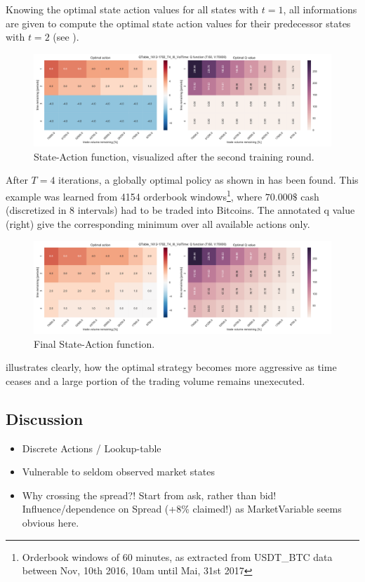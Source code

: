 Knowing the optimal state action values for all states with $t=1$, all informations are given to compute the optimal state action values for their predecessor states with $t=2$ (see ).

\begin{figure}[ht]
	\centering
   \includegraphics[width=1.\textwidth]{content/drawings/heatmap_3months_t2}
	\caption{State-Action function, visualized after the second training round.}
	\label{fig:heatmap:t2}
\end{figure}

After $T=4$ iterations, a globally optimal policy as shown in  has been found. This example was learned from 4154 orderbook windows\footnote{Orderbook windows of 60 minutes, as extracted from USDT\_BTC data between Nov, 10th 2016, 10am until Mai, 31st 2017}, where $70.000\$$ cash (discretized in 8 intervals) had to be traded into Bitcoins. The annotated q value (right) give the corresponding minimum over all available actions only.

\begin{figure}[ht]
	\centering
   \includegraphics[width=1.\textwidth]{content/drawings/heatmap_3months}
	\caption{Final State-Action function.}
	\label{fig:heatmap}
\end{figure}

 illustrates clearly, how the optimal strategy becomes more aggressive as time ceases and a large portion of the trading volume remains unexecuted.

\subsection{Discussion}
\begin{itemize}
\item Discrete Actions / Lookup-table
\item Vulnerable to seldom observed market states
\item Why crossing the spread?! Start from ask, rather than bid!\\
Influence/dependence on Spread (+8\% claimed!) as MarketVariable seems obvious here.
\end{itemize}


